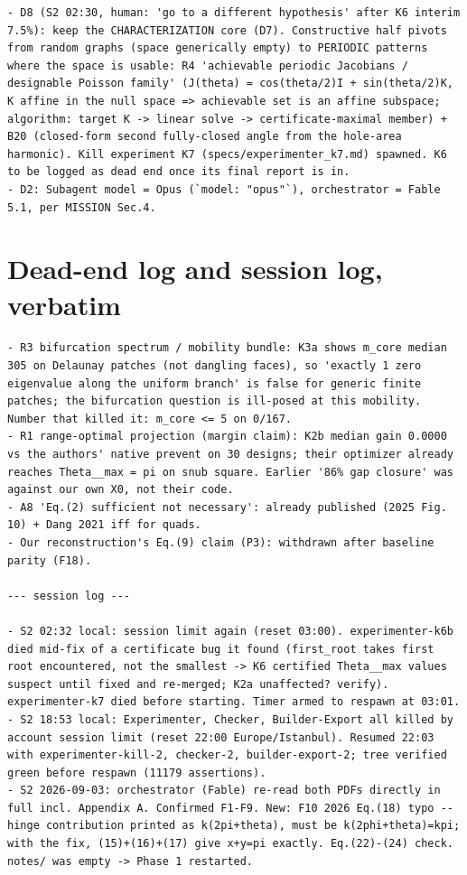 \documentclass[10pt,a4paper]{article}
\begin{document}
\begin{lstlisting}
- D8 (S2 02:30, human: 'go to a different hypothesis' after K6 interim 7.5%): keep the CHARACTERIZATION core (D7). Constructive half pivots from random graphs (space generically empty) to PERIODIC patterns where the space is usable: R4 'achievable periodic Jacobians / designable Poisson family' (J(theta) = cos(theta/2)I + sin(theta/2)K, K affine in the null space => achievable set is an affine subspace; algorithm: target K -> linear solve -> certificate-maximal member) + B20 (closed-form second fully-closed angle from the hole-area harmonic). Kill experiment K7 (specs/experimenter_k7.md) spawned. K6 to be logged as dead end once its final report is in.
- D2: Subagent model = Opus (`model: "opus"`), orchestrator = Fable 5.1, per MISSION Sec.4.
\end{lstlisting}

\section{Dead-end log and session log, verbatim}
\begin{lstlisting}
- R3 bifurcation spectrum / mobility bundle: K3a shows m_core median 305 on Delaunay patches (not dangling faces), so 'exactly 1 zero eigenvalue along the uniform branch' is false for generic finite patches; the bifurcation question is ill-posed at this mobility. Number that killed it: m_core <= 5 on 0/167.
- R1 range-optimal projection (margin claim): K2b median gain 0.0000 vs the authors' native prevent on 30 designs; their optimizer already reaches Theta__max = pi on snub square. Earlier '86% gap closure' was against our own X0, not their code.
- A8 'Eq.(2) sufficient not necessary': already published (2025 Fig. 10) + Dang 2021 iff for quads.
- Our reconstruction's Eq.(9) claim (P3): withdrawn after baseline parity (F18).

--- session log ---

- S2 02:32 local: session limit again (reset 03:00). experimenter-k6b died mid-fix of a certificate bug it found (first_root takes first root encountered, not the smallest -> K6 certified Theta__max values suspect until fixed and re-merged; K2a unaffected? verify). experimenter-k7 died before starting. Timer armed to respawn at 03:01.
- S2 18:53 local: Experimenter, Checker, Builder-Export all killed by account session limit (reset 22:00 Europe/Istanbul). Resumed 22:03 with experimenter-kill-2, checker-2, builder-export-2; tree verified green before respawn (11179 assertions).
- S2 2026-09-03: orchestrator (Fable) re-read both PDFs directly in full incl. Appendix A. Confirmed F1-F9. New: F10 2026 Eq.(18) typo -- hinge contribution printed as k(2pi+theta), must be k(2phi+theta)=kpi; with the fix, (15)+(16)+(17) give x+y=pi exactly. Eq.(22)-(24) check. notes/ was empty -> Phase 1 restarted.
\end{lstlisting}
\end{document}
